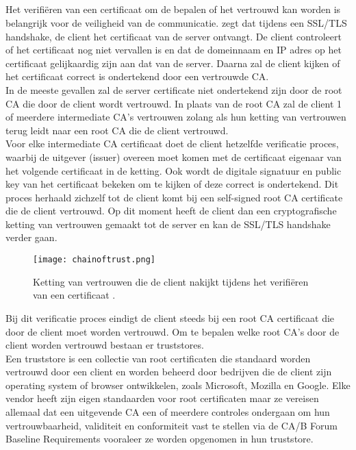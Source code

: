 \subsection{}
\label{subsec:Verificatieproces_van_certificaten}

Het verifiëren van een certificaat om de bepalen of het vertrouwd kan worden is belangrijk voor de veiligheid van de communicatie.
\Textcite{okta} zegt dat tijdens een SSL/TLS handshake, de client het certificaat van de server ontvangt. De client controleert of het certificaat nog niet vervallen is en dat de domeinnaam en IP adres op het certificaat gelijkaardig zijn aan dat van de server. Daarna zal de client kijken of het certificaat correct is ondertekend door een vertrouwde CA. \\

In de meeste gevallen zal de server certificate niet ondertekend zijn door de root CA die door de client wordt vertrouwd. In plaats van de root CA zal de client 1 of meerdere intermediate CA's vertrouwen zolang als hun ketting van vertrouwen terug leidt naar een root CA die de client vertrouwd. \\

Voor elke intermediate CA certificaat doet de client hetzelfde verificatie proces, waarbij de uitgever (issuer) overeen moet komen met de certificaat eigenaar van het volgende certificaat in de ketting. Ook wordt de digitale signatuur en public key van het certificaat bekeken om te kijken of deze correct is ondertekend.
Dit proces herhaald zichzelf tot de client komt bij een self-signed root CA certificate die de client vertrouwd.
Op dit moment heeft de client dan een cryptografische ketting van vertrouwen gemaakt tot de server en kan de SSL/TLS handshake verder gaan. \\
\begin{figure}
  \centering
  \texttt{[image: chainoftrust.png]}
  \caption[Chain of trust]{\label{fig:chainoftrust} Ketting van vertrouwen die de client nakijkt tijdens het verifiëren van een certificaat \autocite{okta}.}
\end{figure}

\pagebreak



Bij dit verificatie proces eindigt de client steeds bij een root CA certificaat die door de client moet worden vertrouwd. Om te bepalen welke root CA's door de client worden vertrouwd bestaan er truststores. \\
Een truststore is een collectie van root certificaten die standaard worden vertrouwd door een client en worden beheerd door bedrijven die de client zijn operating system of browser ontwikkelen, zoals Microsoft, Mozilla en Google.
Elke vendor heeft zijn eigen standaarden voor root certificaten maar ze vereisen allemaal dat een uitgevende CA een of meerdere controles ondergaan om hun vertrouwbaarheid, validiteit en conformiteit vast te stellen via de CA/B Forum Baseline Requirements vooraleer ze worden opgenomen in hun truststore. \autocite{Venafi} \\

